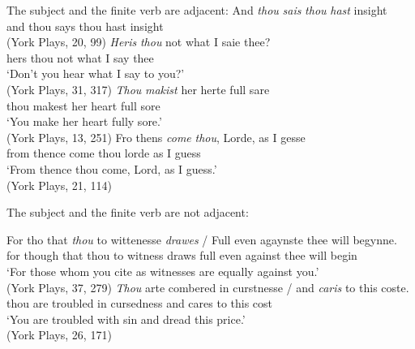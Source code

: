 \documentclass[output=paper]{langsci/langscibook}
\begin{document}
The subject and the finite verb are adjacent:
\ea
\ea \gll And \textit{thou} \textit{sais} \textit{thou} \textit{hast} insight\\
and thou says thou hast insight\\
\glt (York Plays, 20, 99)
\ex \gll \textit{Heris} \textit{thou} not what I saie thee?\\
hers thou not what I say thee\\
\glt ‘Don't you hear what I say to you?'\\
(York Plays, 31, 317)
\ex \gll \textit{Thou} \textit{makist} her herte full sare\\
thou makest her heart full sore\\
\glt ‘You make her heart fully sore.'\\
(York Plays, 13, 251)
\ex \gll Fro thens \textit{come} \textit{thou}, Lorde, as I gesse\\
from thence come thou lorde as I guess\\
\glt ‘From thence thou come, Lord, as I guess.'\\
(York Plays, 21, 114)
\z
\z

The subject and the finite verb are not adjacent:

\ea
\ea \gll For tho that \textit{thou} to wittenesse \textit{drawes} / Full even agaynste thee will begynne.\\
for though that thou to witness draws {} full even against thee will begin\\
\glt `For those whom you cite as witnesses are equally against you.'\\
\glt (York Plays, 37, 279)
\ex \gll \textit{Thou} arte combered in curstnesse / and \textit{caris} to this coste.\\
thou are troubled in cursedness {} and cares to this cost\\
\glt `You are troubled with sin and dread this price.'\\
\glt (York Plays, 26, 171)
\z
\z
\end{document}
